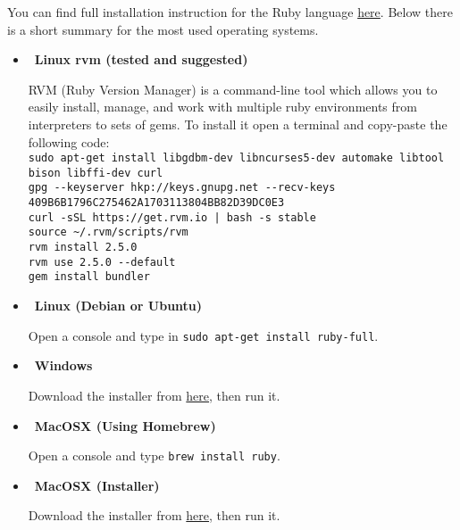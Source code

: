 You can find full installation instruction for the Ruby language \href{https://www.ruby-lang.org/en/documentation/installation/}{here}. Below there is a short summary for the most used operating systems.

\begin{itemize}
\item~\textbf{Linux rvm (tested and suggested)}

RVM (Ruby Version Manager) is a command-line tool which allows you to easily install, manage, and work with multiple ruby environments from interpreters to sets of gems. To install it open a terminal and copy-paste the following code: \\
\verb;sudo apt-get install libgdbm-dev libncurses5-dev automake libtool bison libffi-dev curl; \\
\verb;gpg --keyserver hkp://keys.gnupg.net --recv-keys 409B6B1796C275462A1703113804BB82D39DC0E3; \\
\verb;curl -sSL https://get.rvm.io | bash -s stable; \\
\verb;source ~/.rvm/scripts/rvm; \\
\verb;rvm install 2.5.0;  \\ 
\verb;rvm use 2.5.0 --default; \\
\verb;gem install bundler; \\

\item~\textbf{Linux (Debian or Ubuntu)}

Open a console and type in \verb;sudo apt-get install ruby-full;.

\item~\textbf{Windows}

Download the installer from \href{http://railsinstaller.org/en}{here}, then run it.

\item~\textbf{MacOSX (Using Homebrew)}

Open a console and type \verb;brew install ruby;.

\item~\textbf{MacOSX (Installer)}

Download the installer from \href{http://railsinstaller.org/en}{here}, then run it.
\end{itemize}
